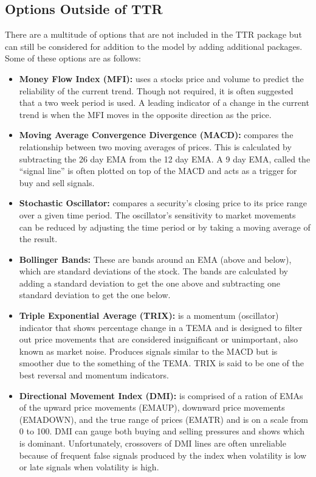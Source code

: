 \documentclass[11pt]{article}
\newcommand*\apos{\textsc{\char13}}
\begin{document}
\subsection*{Options Outside of TTR}\label{OOTTR}
There are a multitude of options that are not included in the TTR package but can still be considered for addition to the model by adding additional packages. Some of these options are as follows:
\begin{itemize}
\item \textbf{Money Flow Index (MFI):} uses a stock\apos s price and volume to predict the reliability of the current trend. Though not required, it is often suggested that a two week period is used. A leading indicator of a change in the current trend is when the MFI moves in the opposite direction as the price.
\item \textbf{Moving Average Convergence Divergence (MACD):} compares the relationship between two moving averages of prices. This is calculated by subtracting the 26 day EMA from the 12 day EMA. A 9 day EMA, called the ``signal line” is often plotted on top of the MACD and acts as a trigger for buy and sell signals.
\item \textbf{Stochastic Oscillator:} compares a security’s closing price to its price range over a given time period. The oscillator’s sensitivity to market movements can be reduced by adjusting the time period or by taking a moving average of the result. 
\item \textbf{Bollinger Bands:} These are bands around an EMA (above and below), which are standard deviations of the stock. The bands are calculated by adding a standard deviation to get the one above and subtracting one standard deviation to get the one below. 
\item \textbf{Triple Exponential Average (TRIX):} is a momentum (oscillator) indicator that shows percentage change in a TEMA and is designed to filter out price movements that are considered insignificant or unimportant, also known as market noise. Produces signals similar to the MACD but is smoother due to the something of the TEMA. TRIX is said to be one of the best reversal and momentum indicators.\textsuperscript{\cite{INV}}
\item \textbf{Directional Movement Index (DMI):} is comprised of a ration of EMAs of the upward price movements (EMAUP), downward price movements (EMADOWN), and the true range of prices (EMATR) and is on a scale from 0 to 100. DMI can gauge both buying and selling pressures and shows which is dominant. Unfortunately, crossovers of DMI lines are often unreliable because of frequent false signals produced by the index when volatility is low or late signals when volatility is high.

\end{itemize}
\end{document}
